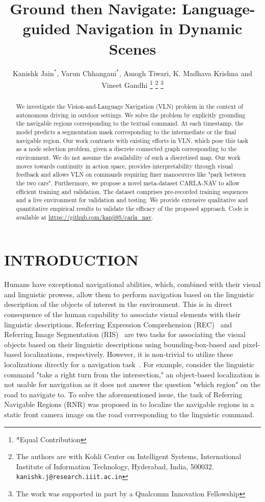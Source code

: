 \documentclass[letterpaper, 10 pt, conference]{ieeeconf}  %
\title{\LARGE \bf Ground then Navigate: Language-guided Navigation in Dynamic Scenes}
\author{Kanishk Jain$^{*}$, Varun Chhangani$^{*}$, Amogh Tiwari, K. Madhava Krishna and Vineet Gandhi
\thanks{*Equal Contribution}
\thanks{The authors are with Kohli Center on Intelligent Systems,  International Institute of Information Technology, Hyderabad, India, 500032.
        {\tt\small kanishk.j@research.iiit.ac.in}}%
\thanks{The work was supported in part by a Qualcomm Innovation Fellowship}%
}
\begin{document}
\maketitle
\thispagestyle{empty}
\pagestyle{empty}


\begin{abstract}

We investigate the Vision-and-Language Navigation (VLN) problem in the context of autonomous driving in outdoor settings. We solve the problem by explicitly grounding the navigable regions corresponding to the textual command. At each timestamp, the model predicts a segmentation mask corresponding to the intermediate or the final navigable region. Our work contrasts with existing efforts in VLN, which pose this task as a node selection problem, given a discrete connected graph corresponding to the environment. We do not assume the availability of such a discretised map. Our work moves towards continuity in action space, provides interpretability through visual feedback and allows VLN on commands requiring finer manoeuvres like "park between the two cars". Furthermore, we propose a novel meta-dataset CARLA-NAV to allow efficient training and validation. The dataset comprises pre-recorded training sequences and a live environment for validation and testing. We provide extensive qualitative and quantitative empirical results to validate the efficacy of the proposed approach. Code is available at \url{https://github.com/kanji95/carla_nav}.

\end{abstract}


\section{INTRODUCTION}

Humans have exceptional navigational abilities, which, combined with their visual and linguistic prowess, allow them to perform navigation based on the linguistic description of the objects of interest in the environment. This is in direct consequence of the human capability to associate visual elements with their linguistic descriptions. Referring Expression Comprehension (REC)~\cite{rohrbach2016grounding} and Referring Image Segmentation (RIS)~\cite{hu2016segmentation} are two tasks for associating the visual objects based on their linguistic descriptions using bounding-box-based and pixel-based localizations, respectively. However, it is non-trivial to utilize these localizations directly for a navigation task~\cite{deruyttere2019talk2car}. For example, consider the linguistic command "take a right turn from the intersection," an object-based localization is not usable for navigation as it does not answer the question "which region" on the road to navigate to. To solve the aforementioned issue, the task of Referring Navigable Regions (RNR) was proposed in \cite{Rufus_2021} to localize the navigable regions in a static front camera image on the road corresponding to the linguistic command. 
\end{document}
